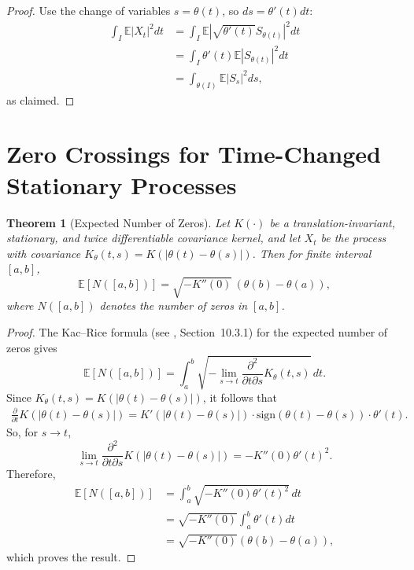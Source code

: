 \documentclass[12pt]{article}
\newtheorem{theorem}{Theorem}[section]
\begin{document}
\begin{proof}
Use the change of variables $s = \theta(t)$, so $ds = \theta'(t) dt$:
\begin{align}
    \int_{I} \mathbb{E}|X_t|^2 dt 
    &= \int_{I} \mathbb{E}|\sqrt{\theta'(t)} S_{\theta(t)}|^2 dt \\
    &= \int_{I} \theta'(t) \mathbb{E}|S_{\theta(t)}|^2 dt \nonumber \\
    &= \int_{\theta(I)} \mathbb{E}|S_s|^2 ds,\nonumber
\end{align}
as claimed.
\end{proof}

\section{Zero Crossings for Time-Changed Stationary Processes}\label{sec:zero_crossings}

\begin{theorem}[Expected Number of Zeros]\label{thm:zero_count}
Let $K(\cdot)$ be a translation-invariant, stationary, and twice differentiable covariance kernel, and let $X_t$ be the process with covariance $K_{\theta}(t,s) = K(|\theta(t)-\theta(s)|)$. Then for finite interval $[a,b]$,
\begin{equation}
    \mathbb{E}[N([a,b])] = \sqrt{-K''(0)}\, (\theta(b) - \theta(a)),
    \label{eq:zero_count}
\end{equation}
where $N([a,b])$ denotes the number of zeros in $[a,b]$.
\end{theorem}

\begin{proof}
The Kac--Rice formula (see \cite{cramer1967}, Section~10.3.1) for the expected number of zeros gives
\begin{equation}
    \mathbb{E}[N([a,b])] = \int_{a}^{b} \sqrt{ - \lim_{s \to t} \frac{\partial^2}{\partial t \partial s} K_{\theta}(t,s) }\, dt. \label{eq:kac_rice}
\end{equation}
Since $K_{\theta}(t,s) = K(|\theta(t)-\theta(s)|)$, it follows that
\begin{align}
    \frac{\partial}{\partial t} K(|\theta(t)-\theta(s)|) = K'(|\theta(t)-\theta(s)|) \cdot \text{sign}(\theta(t) - \theta(s)) \cdot \theta'(t).
\end{align}
So, for $s\to t$,
\begin{equation}
    \lim_{s \to t} \frac{\partial^2}{\partial t \partial s} K(|\theta(t)-\theta(s)|) = - K''(0) \theta'(t)^2.
\end{equation}
Therefore,
\begin{align}
    \mathbb{E}[N([a, b])] &= \int_a^b \sqrt{ - K''(0) \theta'(t)^2 }\, dt \\
    &= \sqrt{ - K''(0) } \int_a^b \theta'(t) dt  \nonumber \\
    &= \sqrt{ - K''(0) } (\theta(b) - \theta(a)), \nonumber
\end{align}
which proves the result.
\end{proof}
\end{document}
